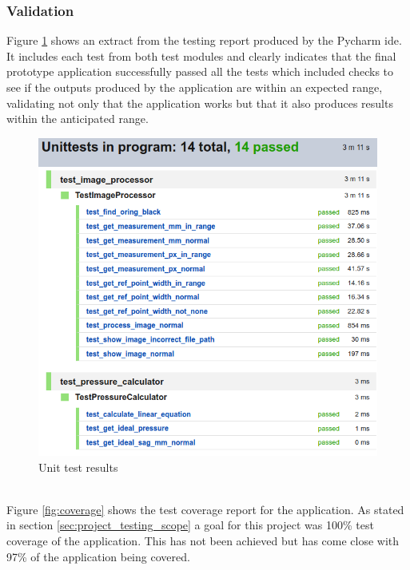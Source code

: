 		\subsubsection{Validation}\label{sec:evaluation_validation}
			Figure \ref{fig:test_results} shows an extract from the testing report produced by the Pycharm \gls{ide}. It includes each test from both test modules and clearly indicates that the final prototype application successfully passed all the tests which  included checks to see if the outputs produced by the application are within an expected range, validating not only that the application works but that it also produces  results within the anticipated range.
			\begin{figure}[h!]
				\centering
				\includegraphics[scale=0.5]{../images/results/test_results.png}
				\caption{Unit test results}
				\label{fig:test_results}
			\end{figure}\\
			Figure \ref{fig:coverage} shows the test coverage report for the application. As stated in section \ref{sec:project_testing_scope} a goal for this project was 100\% test coverage of the application. This has not been achieved but has come close with 97\% of the application being covered. 
			\\\\
